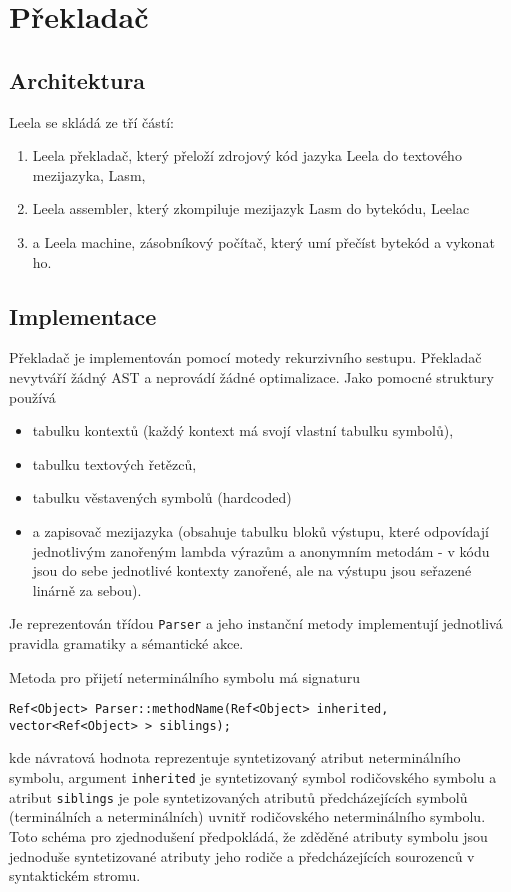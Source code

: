 \documentclass[10pt,a4paper]{article}
\begin{document}
\section{Překladač}
\label{sec:prekladac}

\subsection{Architektura}

Leela se skládá ze tří částí:
\begin{enumerate}
\item Leela překladač, který přeloží zdrojový kód jazyka Leela do textového mezijazyka, Lasm,
\item Leela assembler, který zkompiluje mezijazyk Lasm do bytekódu, Leelac
\item a Leela machine, zásobníkový počítač, který umí přečíst bytekód a vykonat ho.
\end{enumerate}

\subsection{Implementace}

Překladač je implementován pomocí motedy rekurzivního sestupu. Překladač
nevytváří žádný AST a neprovádí žádné optimalizace. Jako pomocné struktury
používá
\begin{itemize}
\item tabulku kontextů (každý kontext má svojí vlastní tabulku symbolů),
\item tabulku textových řetězců,
\item tabulku věstavených symbolů (hardcoded)
\item a zapisovač mezijazyka (obsahuje tabulku bloků výstupu, které odpovídají
      jednotlivým zanořeným lambda výrazům a anonymním metodám - v kódu jsou
      do sebe jednotlivé kontexty zanořené, ale na výstupu jsou seřazené linárně
      za sebou).
\end{itemize}
Je reprezentován třídou \texttt{Parser} a jeho instanční metody implementují
jednotlivá pravidla gramatiky a sémantické akce. 

Metoda pro přijetí neterminálního symbolu má signaturu
\begin{lstlisting}
Ref<Object> Parser::methodName(Ref<Object> inherited, vector<Ref<Object> > siblings);
\end{lstlisting}
kde návratová hodnota reprezentuje syntetizovaný atribut neterminálního
symbolu, argument \texttt{inherited} je syntetizovaný symbol rodičovského symbolu
a atribut \texttt{siblings} je pole syntetizovaných atributů předcházejících
symbolů (terminálních a neterminálních) uvnitř rodičovského neterminálního
symbolu. Toto schéma pro zjednodušení předpokládá, že zděděné atributy symbolu
jsou jednoduše syntetizované atributy jeho rodiče a předcházejících sourozenců
v syntaktickém stromu.
\end{document}
